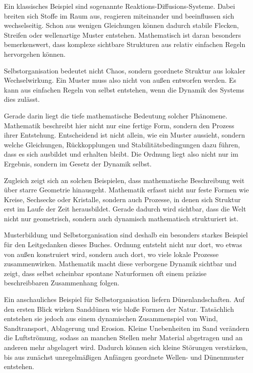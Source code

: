 Ein klassisches Beispiel sind sogenannte Reaktions-Diffusions-Systeme.
Dabei breiten sich Stoffe im Raum aus,
reagieren miteinander
und beeinflussen sich wechselseitig.
Schon aus wenigen Gleichungen können dadurch stabile Flecken,
Streifen
oder wellenartige Muster entstehen.
Mathematisch ist daran besonders bemerkenswert,
dass komplexe sichtbare Strukturen aus relativ einfachen Regeln hervorgehen können.

\begin{DidacticBox}
	Selbstorganisation bedeutet nicht Chaos,
	sondern geordnete Struktur aus lokaler Wechselwirkung.
	Ein Muster muss also nicht von außen entworfen werden.
	Es kann aus einfachen Regeln von selbst entstehen,
	wenn die Dynamik des Systems dies zulässt.
\end{DidacticBox}

Gerade darin liegt die tiefe mathematische Bedeutung solcher Phänomene.
Mathematik beschreibt hier nicht nur eine fertige Form,
sondern den Prozess ihrer Entstehung.
Entscheidend ist nicht allein,
wie ein Muster aussieht,
sondern welche Gleichungen,
Rückkopplungen
und Stabilitätsbedingungen dazu führen,
dass es sich ausbildet und erhalten bleibt.
Die Ordnung liegt also nicht nur im Ergebnis,
sondern im Gesetz der Dynamik selbst.

Zugleich zeigt sich an solchen Beispielen,
dass mathematische Beschreibung weit über starre Geometrie hinausgeht.
Mathematik erfasst nicht nur feste Formen wie Kreise,
Sechsecke
oder Kristalle,
sondern auch Prozesse,
in denen sich Struktur erst im Laufe der Zeit herausbildet.
Gerade dadurch wird sichtbar,
dass die Welt nicht nur geometrisch,
sondern auch dynamisch mathematisch strukturiert ist.

Musterbildung und Selbstorganisation sind deshalb ein besonders starkes Beispiel
für den Leitgedanken dieses Buches.
Ordnung entsteht nicht nur dort,
wo etwas von außen konstruiert wird,
sondern auch dort,
wo viele lokale Prozesse zusammenwirken.
Mathematik macht diese verborgene Dynamik sichtbar
und zeigt,
dass selbst scheinbar spontane Naturformen oft einem präzise beschreibbaren Zusammenhang folgen.

Ein anschauliches Beispiel für Selbstorganisation liefern Dünenlandschaften.
Auf den ersten Blick wirken Sanddünen wie bloße Formen der Natur.
Tatsächlich entstehen sie jedoch aus einem dynamischen Zusammenspiel von Wind,
Sandtransport,
Ablagerung
und Erosion.
Kleine Unebenheiten im Sand verändern die Luftströmung,
sodass an manchen Stellen mehr Material abgetragen
und an anderen mehr abgelagert wird.
Dadurch können sich kleine Störungen verstärken,
bis aus zunächst unregelmäßigen Anfängen geordnete Wellen-
und Dünenmuster entstehen.

